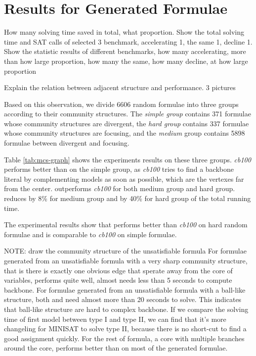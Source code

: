 \section{Results for Generated Formulae}
How many solving time saved in total, what proportion.
Show the total solving time and SAT calls of selected 3 benchmark, accelerating 1, the same 1, decline 1.
Show the statistic results of different benchmarks, how many accelerating, more than how large proportion, how many the same, how many decline, at how large proportion

Explain the relation between adjacent structure and performance.
3 pictures

Based on this observation, we divide 6606 random formulae into three groups according to their community structures.
The \emph{simple group} contains 371 formulae whose community structures are divergent,
the \emph{hard group} contains 337 formulae whose community structures are focusing,
and the \emph{medium} group contains 5898 formulae between divergent and focusing.


Table \ref{tab:mcs-graph} shows the experiments results on these three groups. \textit{cb100} performs better than \tool on the simple group, as \textit{cb100} tries to find a backbone literal by complementing models as soon as possible, which are the vertexes far from the center.
\tool outperforms \textit{cb100} for both medium group and hard group.
\tool reduces by 8\% for medium group and by 40\% for hard group of the total running time.

The experimental results show that \tool performs better than \textit{cb100} on hard random formulae and is comparable to \textit{cb100} on simple formulae.

NOTE: draw the community structure of the unsatisfiable formula
For formulae generated from an unsatisfiable formula with a very sharp community structure, that is there is exactly one obvious edge that sperate away from the core of variables, \tool performs quite well, almost needs less than 5 seconds to compute backbone.
For formulae generated from an unsatisfiable formula with a ball-like structure, both \tool and \minibones need almost more than 20 seconds to solve. This indicates that ball-like structure are hard to complex backbone. If we compare the solving time of first model between type I and type II, we can find that it's more changeling for MINISAT to solve type II, because there is no short-cut to find a good assignment quickly.
For the rest of formula, a core with multiple branches around the core, \tool performs better than \minibones on most of the generated formulae.




